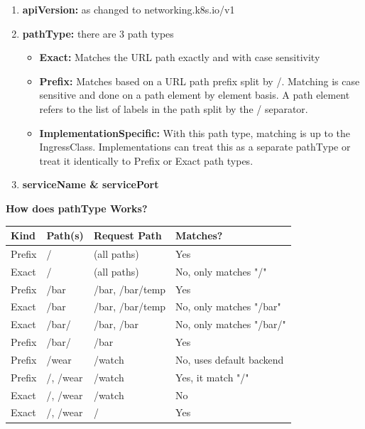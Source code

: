 \documentclass{article}
\begin{document}
\begin{enumerate}
    \item \textbf{apiVersion:} as changed to networking.k8s.io/v1
    \item \textbf{pathType:} there are 3 path types
    \begin{itemize}
        \item \textbf{Exact:} Matches the URL path exactly and with case sensitivity
        \item \textbf{Prefix:} Matches based on a URL path prefix split by /. Matching is case sensitive and done on a path element by element basis. A path element refers to the list of labels in the path split by the / separator.
        \item \textbf{ImplementationSpecific:} With this path type, matching is up to the IngressClass. Implementations can treat this as a separate pathType or treat it identically to Prefix or Exact path types.
    \end{itemize}
    \item \textbf{serviceName \& servicePort}
\end{enumerate}

\textbf{How does pathType Works?}
\begin{table}[H]
\begin{tabular}{| m{2.5cm} | m{2cm} | m{3.5cm} | m{4cm} |}
\hline
\textbf{Kind} & \textbf{Path(s)} & \textbf{Request Path} & \textbf{Matches?} \\ \hline
Prefix & / & (all paths) & Yes \\ \hline
Exact & / & (all paths) & No, only matches "/" \\ \hline
Prefix & /bar & /bar, /bar/temp & Yes \\ \hline
Exact & /bar & /bar, /bar/temp & No, only matches "/bar" \\ \hline
Exact & /bar/ & /bar, /bar & No, only matches "/bar/" \\ \hline
Prefix & /bar/ & /bar & Yes \\ \hline
Prefix & /wear & /watch & No, uses default backend \\ \hline
Prefix & /, /wear & /watch & Yes, it match "/" \\ \hline
Exact & /, /wear & /watch & No \\ \hline
Exact & /, /wear & / & Yes \\ \hline
\end{tabular}
\end{table}
\end{document}
